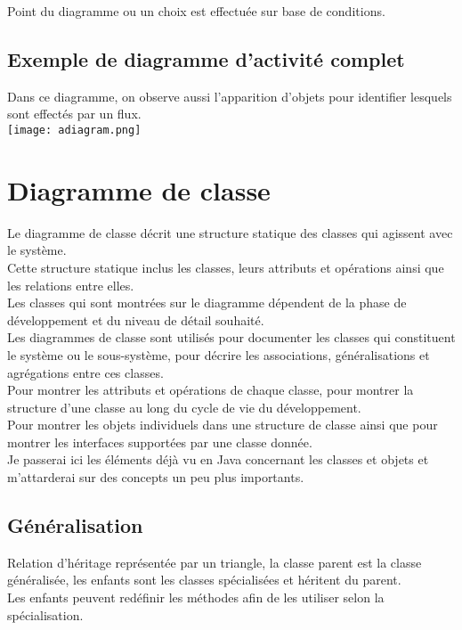 \documentclass{report}
\begin{document}
			Point du diagramme ou un choix est effectuée sur base de conditions.\\

		\subsection{Exemple de diagramme d'activité complet}

			Dans ce diagramme, on observe aussi l'apparition d'objets pour identifier lesquels sont effectés par un flux.\\

			\texttt{[image: adiagram.png]}

	\section{Diagramme de classe}

		Le diagramme de classe décrit une structure statique des classes qui agissent avec le système.\\
		Cette structure statique inclus les classes, leurs attributs et opérations ainsi que les relations entre elles.\\

		Les classes qui sont montrées sur le diagramme dépendent de la phase de développement et du niveau de détail souhaité.\\

		Les diagrammes de classe sont utilisés pour documenter les classes qui constituent le système ou le sous-système, pour décrire les associations, généralisations et agrégations entre ces classes.\\
		Pour montrer les attributs et opérations de chaque classe, pour montrer la structure d'une classe au long du cycle de vie du développement.\\
		Pour montrer les objets individuels dans une structure de classe ainsi que pour montrer les interfaces supportées par une classe donnée.\\

		Je passerai ici les éléments déjà vu en Java concernant les classes et objets et m'attarderai sur des concepts un peu plus importants.\\

		\subsection{Généralisation}

			Relation d'héritage représentée par un triangle, la classe parent est la classe généralisée, les enfants sont les classes spécialisées et héritent du parent.\\
			Les enfants peuvent redéfinir les méthodes afin de les utiliser selon la spécialisation.\\
\end{document}
